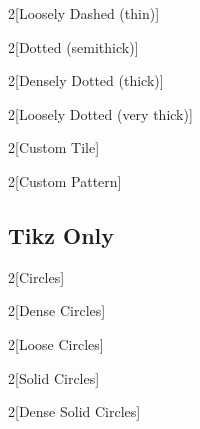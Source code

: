 \documentclass{article}
\begin{document}
\begin{multicols}{2}[Loosely Dashed (thin)]
  \lipsum[1]
\end{multicols}

\begin{multicols}{2}[Dotted (semithick)]
  \lipsum[1]
\end{multicols}

\begin{multicols}{2}[Densely Dotted (thick)]
  \lipsum[1]
\end{multicols}

\begin{multicols}{2}[Loosely Dotted (very thick)]
  \lipsum[1]
\end{multicols}

\begin{multicols}{2}[Custom Tile]
  \lipsum[1]
\end{multicols}

\begin{multicols}{2}[Custom Pattern]
  \lipsum[1]
\end{multicols}

\subsection*{Tikz Only}
\begin{multicols}{2}[Circles]
  \lipsum[1]
\end{multicols}

\begin{multicols}{2}[Dense Circles]
  \lipsum[1]
\end{multicols}

\begin{multicols}{2}[Loose Circles]
  \lipsum[1]
\end{multicols}

\begin{multicols}{2}[Solid Circles]
  \lipsum[1]
\end{multicols}

\begin{multicols}{2}[Dense Solid Circles]
  \lipsum[1]
\end{multicols}
\end{document}
